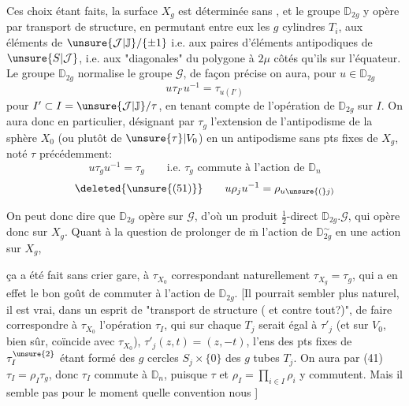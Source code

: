 Ces choix étant faits, la surface $X_g$ est déterminée sans
, et le groupe $\mathbb D_{2g}$ y opère par transport de
structure, en permutant entre eux les $g$ cylindres $T_i$,
 aux éléments de
$\unsure{\mathcal J|\mathbb J}/\{\pm1\}$ i.e.
aux paires d'éléments antipodiques de $\unsure{S|\mathcal J}$,
i.e. aux "diagonales" du polygone à $2\mu$ côtés
qu'ils 
sur l'équateur. Le groupe $\mathbb D_{2g}$ normalise
 le groupe $\mathcal G$, de façon précise
on aura, pour $u\in\mathbb D_{2g}$
\[
\tag{49}
u\tau_{I'}u^{-1}=\tau_{u(I')}
\]
pour $I'\subset I=\unsure{\mathcal J|\mathbb J}/\tau$, en tenant compte de
l'opération de $\mathbb D_{2g}$ sur $I$. On aura donc en
particulier, désignant par $\tau_g$\inserted{$=\tau_\varnothing$}
l'extension  de l'antipodisme de la sphère $X_0$
(ou plutôt de $\unsure{\tau}\vert V_0$) en un antipodisme
sans pts fixes de $X_g$, noté $\tau$ précédemment:
\[
\tag{50}
u\tau_g u^{-1}=\tau_g
\qquad\text{i.e. $\tau_g$ commute à l'action de $\mathbb D_n$}
\]
\[
\deleted{\unsure{(51)}}\qquad
u\rho_j u^{-1}=\rho_{u\unsure{(}j)}
\]

On peut donc dire que $\mathbb D_{2g}$ opère sur $\mathcal G$,
d'où un produit $\frac12$-direct $\mathbb D_{2g}.\mathcal G$,
qui opère donc sur $X_g$.
Quant à la question de prolonger de $\overline{\mathrm m}$
l'action  de $\mathbb D_{2g}^\sim$
  en une action sur $X_g$,


ça a été fait sans crier gare, à $\tau_{X_0}$ correspondant
naturellement $\tau_{X_g}=\tau_g$, qui a en effet le bon goût
de commuter à l'action de $\mathbb D_{2g}$.
[Il pourrait sembler plus naturel, il est vrai, dans un
esprit de "transport de structure ( et contre
tout?)", de faire correspondre à $\tau_{X_0}$ l'opération
$\tau_I$, qui sur
chaque $T_j$ serait égal à $\tau'_j$
(et sur $V_0$, bien sûr, coïncide avec $\tau_{X_0}$),
$\tau'_j(z,t)=(z,-t)$,
 l'ens des pts fixes de $\tau_I^{\unsure{2}}$
étant formé des $g$ cercles  $S_j\times\{0\}$
des $g$ tubes $T_j$. On aura par (41)
$\tau_I=\rho_I\tau_g$, donc $\tau_I$ commute
 à $\mathbb D_n$, puisque $\tau$ et
$\rho_I=\prod_{i\in I}\rho_i$ y commutent.
Mais il  semble pas  pour le moment
quelle convention nous ]

